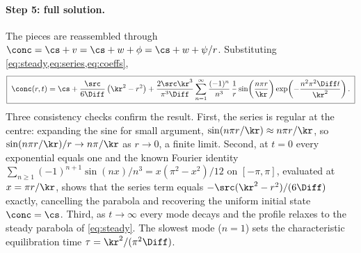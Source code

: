 \paragraph{Step 5: full solution.}
The pieces are reassembled through
$\conc = \cs + v = \cs + w + \phi = \cs + w + \psi/r$. Substituting
\cref{eq:steady,eq:series,eq:coeffs},
%
\begin{equation}
  \boxed{\;
  \conc(r,t) = \cs
  + \frac{\src}{6\Diff}\left( \kr^{2} - r^{2} \right)
  + \frac{2 \src \kr^{3}}{\pi^{3} \Diff}
  \sum_{n=1}^{\infty} \frac{(-1)^{n}}{n^{3}}\,
  \frac{1}{r}\sin\!\left( \frac{n\pi r}{\kr} \right)
  \exp\!\left( -\frac{n^{2}\pi^{2}\Diff t}{\kr^{2}} \right) .
  \;}
  \label{eq:full-solution}
\end{equation}
%
Three consistency checks confirm the result. First, the series is regular at the
centre: expanding the sine for small argument,
$\sin(n\pi r/\kr) \approx n\pi r/\kr$, so
$\sin(n\pi r/\kr)/r \to n\pi/\kr$ as $r \to 0$, a finite limit. Second, at $t = 0$
every exponential equals one and the known Fourier identity
$\sum_{n\ge 1} (-1)^{n+1} \sin(nx)/n^{3} = x(\pi^{2}-x^{2})/12$ on $[-\pi,\pi]$,
evaluated at $x = \pi r/\kr$, shows that the series term equals
$-\src(\kr^{2}-r^{2})/(6\Diff)$ exactly, cancelling the parabola and recovering the
uniform initial state $\conc = \cs$. Third, as $t \to \infty$ every mode decays and
the profile relaxes to the steady parabola of \cref{eq:steady}. The slowest mode
($n = 1$) sets the characteristic equilibration time
$\tau = \kr^{2}/(\pi^{2}\Diff)$.

